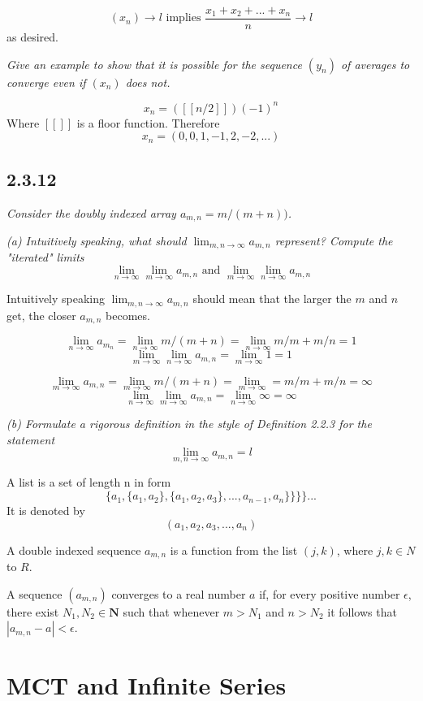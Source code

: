\documentclass[11pt,oneside,titlepage]{book}
\begin{document}
$$(x_n) \to l \text{ implies } \frac{x_1 + x_2 + ... + x_n}{n} \to l$$
as desired.

\textit{Give an example to show that it is possible for the sequence $(y_n)$
  of averages to converge even if $(x_n)$ does not.}

$$x_n = ([[n / 2]])(-1)^n$$
Where $[[]]$ is a floor function.
Therefore
$$x_n = (0, 0, 1, -1, 2, -2, ...)$$


\subsection*{2.3.12}
\textit{Consider the doubly indexed array $a_{m,n} = m / (m + n))$.}

\textit{(a) Intuitively speaking, what should $\lim_{m,n \to \infty} a_{m,n}$
  represent? Compute the "iterated" limits}
$$ \lim_{n \to \infty} \lim_{m \to \infty} a_{m,n} \text{ and }
\lim_{m \to \infty} \lim_{n \to \infty} a_{m,n} $$

Intuitively speaking $\lim_{m,n \to \infty} a_{m,n}$ should mean that
the larger the $m$ and $n$ get, the closer $a_{m,n}$ becomes.

$$\lim_{n \to \infty} a_{m_n} = \lim_{n \to \infty} m/(m + n) =
\lim_{n \to \infty} m/m + m/n = 1$$  
$$\lim_{m \to \infty} \lim_{n \to \infty} a_{m,n} =
\lim_{m \to \infty}  1 = 1$$

$$\lim_{m \to \infty} a_{m,n} = \lim_{m \to \infty} m/(m + n) =
\lim_{m \to \infty} = m/m + m/n = \infty$$
$$\lim_{n \to \infty} \lim_{m \to \infty} a_{m,n} = \lim_{n \to \infty} \infty = \infty$$

\textit{(b) Formulate a rigorous definition in the style of Definition 2.2.3
  for the statement}
$$\lim_{m,n \to \infty} a_{m,n} = l$$

A list is a set of length n in form
$$\{a_1, \{a_1, a_2\}, \{a_1, a_2, a_3\}, ..., a_{n -1}, a_n\}\}\}\}... $$
It is denoted by
$$(a_1, a_2, a_3, ..., a_n)$$

A double indexed sequence $a_{m,n}$ is a function from the list $(j, k)$,
where $j, k \in N$ to $R$.

A sequence $(a_{m, n})$ converges to a real number $a$ if, for every positive
number $\epsilon$, there exist $N_1, N_2 \in \textbf{N}$ such that
whenever $m > N_1$ and $n > N_2$ it follows that $|a_{m,n} - a| <
\epsilon$.

\section{MCT and Infinite Series}
\end{document}
